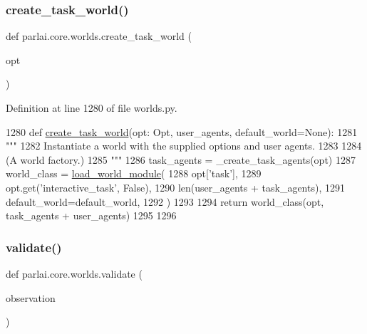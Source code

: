 \subsubsection{\texorpdfstring{create\+\_\+task\+\_\+world()}{create\_task\_world()}}
{\footnotesize\ttfamily def parlai.\+core.\+worlds.\+create\+\_\+task\+\_\+world (\begin{DoxyParamCaption}\item[{}]{opt }\end{DoxyParamCaption})}



Definition at line 1280 of file worlds.\+py.


\begin{DoxyCode}
1280 \textcolor{keyword}{def }\hyperlink{namespaceparlai_1_1core_1_1worlds_ae4ed098adcaad6ec7563e665485ccdcf}{create\_task\_world}(opt: Opt, user\_agents, default\_world=\textcolor{keywordtype}{None}):
1281     \textcolor{stringliteral}{"""}
1282 \textcolor{stringliteral}{    Instantiate a world with the supplied options and user agents.}
1283 \textcolor{stringliteral}{}
1284 \textcolor{stringliteral}{    (A world factory.)}
1285 \textcolor{stringliteral}{    """}
1286     task\_agents = \_create\_task\_agents(opt)
1287     world\_class = \hyperlink{namespaceparlai_1_1core_1_1loader_adb9c272f49c31c45dcbc61d8e8c6316d}{load\_world\_module}(
1288         opt[\textcolor{stringliteral}{'task'}],
1289         opt.get(\textcolor{stringliteral}{'interactive\_task'}, \textcolor{keyword}{False}),
1290         len(user\_agents + task\_agents),
1291         default\_world=default\_world,
1292     )
1293 
1294     \textcolor{keywordflow}{return} world\_class(opt, task\_agents + user\_agents)
1295 
1296 
\end{DoxyCode}
\mbox{\label{namespaceparlai_1_1core_1_1worlds_afc3fad603b7bce41dbdc9cdc04a9c794}} 
\subsubsection{\texorpdfstring{validate()}{validate()}}
{\footnotesize\ttfamily def parlai.\+core.\+worlds.\+validate (\begin{DoxyParamCaption}\item[{}]{observation }\end{DoxyParamCaption})}

